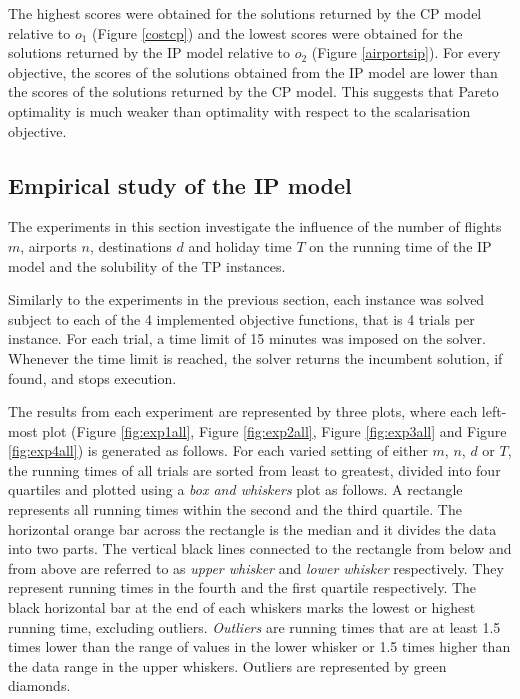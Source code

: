 \documentclass{mpaper}
\begin{document}
The highest scores were obtained for the solutions returned by the CP model relative to $o_1$ (Figure \ref{costcp}) and the lowest scores were obtained for the solutions returned by the IP model relative to $o_2$ (Figure \ref{airportsip}). For every objective, the scores of the solutions obtained from the IP model are lower than the scores of the solutions returned by the CP model. This suggests that Pareto optimality is much weaker than optimality with respect to the scalarisation objective.

\subsection{Empirical study of the IP model}
\label{experiments:ipmodel}
The experiments in this section investigate the influence of the number of flights $m$, airports $n$, destinations $d$ and holiday time $T$ on the running time of the IP model and the solubility of the TP instances.

Similarly to the experiments in the previous section, each instance was solved subject to each of the 4 implemented objective functions, that is 4 trials per instance. For each trial, a time limit of 15 minutes was imposed on the solver. Whenever the time limit is reached, the solver returns the incumbent solution, if found, and stops execution.

The results from each experiment are represented by three plots, where each left-most plot (Figure \ref{fig:exp1all}, Figure \ref{fig:exp2all}, Figure \ref{fig:exp3all} and Figure \ref{fig:exp4all}) is generated as follows. For each varied setting of either $m$, $n$, $d$ or $T$, the running times of all trials are sorted from least to greatest, divided into four quartiles and plotted using a \textit{box and whiskers} plot as follows. A rectangle represents all running times within the second and the third quartile. The horizontal orange bar across the rectangle is the median and it divides the data into two parts. The vertical black lines connected to the rectangle from below and from above are referred to as \textit{upper whisker} and \textit{lower whisker} respectively. They represent running times in the fourth and the first quartile respectively. The black horizontal bar at the end of each whiskers marks the lowest or highest running time, excluding outliers. \textit{Outliers} are running times that are at least 1.5 times lower than the range of values in the lower whisker or 1.5 times higher than the data range in the upper whiskers. Outliers are represented by green diamonds.
\end{document}
